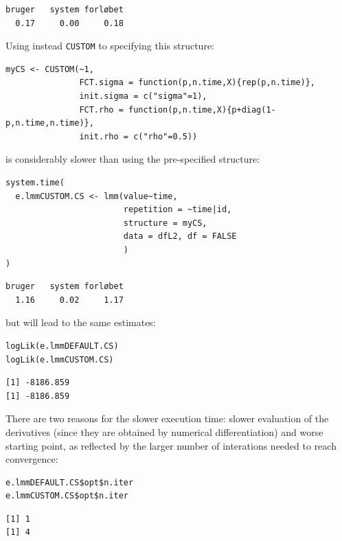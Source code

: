 \documentclass[12pt]{article}
\begin{document}
\begin{verbatim}
bruger   system forløbet 
  0.17     0.00     0.18
\end{verbatim}



Using instead \texttt{CUSTOM} to specifying this structure:
\lstset{language=r,label= ,caption= ,captionpos=b,numbers=none}
\begin{lstlisting}
myCS <- CUSTOM(~1,
               FCT.sigma = function(p,n.time,X){rep(p,n.time)},
               init.sigma = c("sigma"=1), 
               FCT.rho = function(p,n.time,X){p+diag(1-p,n.time,n.time)},
               init.rho = c("rho"=0.5))
\end{lstlisting}

is considerably slower than using the pre-specified structure:
\lstset{language=r,label= ,caption= ,captionpos=b,numbers=none}
\begin{lstlisting}
system.time(
  e.lmmCUSTOM.CS <- lmm(value~time,
                        repetition = ~time|id,
                        structure = myCS, 
                        data = dfL2, df = FALSE
                        )
)
\end{lstlisting}

\begin{verbatim}
bruger   system forløbet 
  1.16     0.02     1.17
\end{verbatim}



but will lead to the same estimates:
\lstset{language=r,label= ,caption= ,captionpos=b,numbers=none}
\begin{lstlisting}
logLik(e.lmmDEFAULT.CS)
logLik(e.lmmCUSTOM.CS)

\end{lstlisting}

\begin{verbatim}
[1] -8186.859
[1] -8186.859
\end{verbatim}


There are two reasons for the slower execution time: slower evaluation
of the derivatives (since they are obtained by numerical
differentiation) and worse starting point, as reflected by the larger
number of interations needed to reach convergence:
\lstset{language=r,label= ,caption= ,captionpos=b,numbers=none}
\begin{lstlisting}
e.lmmDEFAULT.CS$opt$n.iter
e.lmmCUSTOM.CS$opt$n.iter
\end{lstlisting}

\begin{verbatim}
[1] 1
[1] 4
\end{verbatim}
\end{document}
